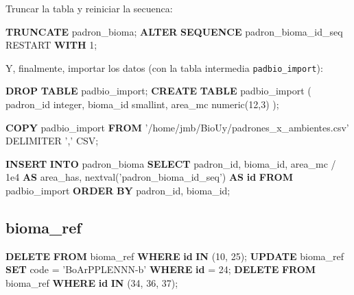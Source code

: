 \documentclass[spanish,]{article}
\newenvironment{Shaded}{}{}
\newcommand{\KeywordTok}[1]{\textcolor[rgb]{0.00,0.44,0.13}{\textbf{{#1}}}}
\newcommand{\DataTypeTok}[1]{\textcolor[rgb]{0.56,0.13,0.00}{{#1}}}
\newcommand{\DecValTok}[1]{\textcolor[rgb]{0.25,0.63,0.44}{{#1}}}
\newcommand{\FloatTok}[1]{\textcolor[rgb]{0.25,0.63,0.44}{{#1}}}
\newcommand{\StringTok}[1]{\textcolor[rgb]{0.25,0.44,0.63}{{#1}}}
\newcommand{\NormalTok}[1]{{#1}}
\begin{document}
Truncar la tabla y reiniciar la secuenca:

\begin{Shaded}
\begin{Highlighting}[]
\KeywordTok{TRUNCATE} \NormalTok{padron_bioma;}
\KeywordTok{ALTER}  \KeywordTok{SEQUENCE} \NormalTok{padron_bioma_id_seq RESTART }\KeywordTok{WITH} \DecValTok{1}\NormalTok{;}
\end{Highlighting}
\end{Shaded}

Y, finalmente, importar los datos (con la tabla intermedia
\texttt{padbio\_import}):

\begin{Shaded}
\begin{Highlighting}[]
\KeywordTok{DROP} \KeywordTok{TABLE} \NormalTok{padbio_import;}
\KeywordTok{CREATE} \KeywordTok{TABLE} \NormalTok{padbio_import (}
  \NormalTok{padron_id }\DataTypeTok{integer}\NormalTok{,}
  \NormalTok{bioma_id }\DataTypeTok{smallint}\NormalTok{,}
  \NormalTok{area_mc }\DataTypeTok{numeric}\NormalTok{(}\DecValTok{12}\NormalTok{,}\DecValTok{3}\NormalTok{)}
\NormalTok{);}
    
\KeywordTok{COPY} \NormalTok{padbio_import }\KeywordTok{FROM} \StringTok{'/home/jmb/BioUy/padrones_x_ambientes.csv'} \NormalTok{DELIMITER }\StringTok{','} \NormalTok{CSV;}

\KeywordTok{INSERT} \KeywordTok{INTO} \NormalTok{padron_bioma }
  \KeywordTok{SELECT} \NormalTok{padron_id, }
         \NormalTok{bioma_id,}
         \NormalTok{area_mc / }\FloatTok{1e4} \KeywordTok{AS} \NormalTok{area_has,}
         \NormalTok{nextval(}\StringTok{'padron_bioma_id_seq'}\NormalTok{) }\KeywordTok{AS} \KeywordTok{id}
    \KeywordTok{FROM} \NormalTok{padbio_import }
   \KeywordTok{ORDER} \KeywordTok{BY} \NormalTok{padron_id, bioma_id;}
\end{Highlighting}
\end{Shaded}

\subsection{bioma\_ref}\label{biomaux5fref}

\begin{Shaded}
\begin{Highlighting}[]
\KeywordTok{DELETE} \KeywordTok{FROM} \NormalTok{bioma_ref }\KeywordTok{WHERE} \KeywordTok{id} \KeywordTok{IN} \NormalTok{(}\DecValTok{10}\NormalTok{, }\DecValTok{25}\NormalTok{);}
\KeywordTok{UPDATE} \NormalTok{bioma_ref }\KeywordTok{SET} \NormalTok{code = }\StringTok{'BoArPPLENNN-b'} \KeywordTok{WHERE} \KeywordTok{id} \NormalTok{= }\DecValTok{24}\NormalTok{;}
\KeywordTok{DELETE} \KeywordTok{FROM} \NormalTok{bioma_ref }\KeywordTok{WHERE} \KeywordTok{id} \KeywordTok{IN} \NormalTok{(}\DecValTok{34}\NormalTok{, }\DecValTok{36}\NormalTok{, }\DecValTok{37}\NormalTok{);}
\end{Highlighting}
\end{Shaded}
\end{document}
